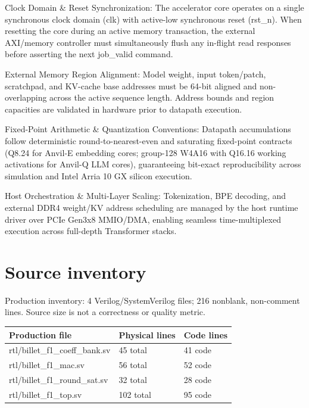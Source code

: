 \documentclass[11pt,a4paper]{article}
\begin{document}
Clock Domain \& Reset Synchronization: The accelerator core operates on a single synchronous clock domain (\allowbreak{}clk)\allowbreak{} with active-low synchronous reset (\allowbreak{}rst\_\allowbreak{}n)\allowbreak{}. When resetting the core during an active memory transaction,\allowbreak{} the external AXI/\allowbreak{}memory controller must simultaneously flush any in-flight read responses before asserting the next job\_\allowbreak{}valid command.


External Memory Region Alignment: Model weight,\allowbreak{} input token/\allowbreak{}patch,\allowbreak{} scratchpad,\allowbreak{} and KV-cache base addresses must be 64-bit aligned and non-overlapping across the active sequence length. Address bounds and region capacities are validated in hardware prior to datapath execution.


Fixed-Point Arithmetic \& Quantization Conventions: Datapath accumulations follow deterministic round-to-nearest-even and saturating fixed-point contracts (\allowbreak{}Q8.24 for Anvil-E embedding cores; group-128 W4A16 with Q16.16 working activations for Anvil-Q LLM cores)\allowbreak{},\allowbreak{} guaranteeing bit-exact reproducibility across simulation and Intel Arria 10 GX silicon execution.


Host Orchestration \& Multi-Layer Scaling: Tokenization,\allowbreak{} BPE decoding,\allowbreak{} and external DDR4 weight/\allowbreak{}KV address scheduling are managed by the host runtime driver over PCIe Gen3x8 MMIO/\allowbreak{}DMA,\allowbreak{} enabling seamless time-multiplexed execution across full-depth Transformer stacks.


\appendix{}\section{Source inventory}

Production inventory: 4 Verilog/\allowbreak{}SystemVerilog files; 216 nonblank,\allowbreak{} non-comment lines. Source size is not a correctness or quality metric.

{\small\renewcommand{\arraystretch}{1.18}\begin{longtable}{@{}L{0.55\textwidth}|L{0.18\textwidth}|L{0.18\textwidth}@{}}\toprule

\textbf{Production file} & \textbf{Physical lines} & \textbf{Code lines}\\\midrule\endhead

rtl/\allowbreak{}billet\_\allowbreak{}f1\_\allowbreak{}coeff\_\allowbreak{}bank.sv & 45 total & 41 code\\[2pt]\hline

rtl/\allowbreak{}billet\_\allowbreak{}f1\_\allowbreak{}mac.sv & 56 total & 52 code\\[2pt]\hline

rtl/\allowbreak{}billet\_\allowbreak{}f1\_\allowbreak{}round\_\allowbreak{}sat.sv & 32 total & 28 code\\[2pt]\hline

rtl/\allowbreak{}billet\_\allowbreak{}f1\_\allowbreak{}top.sv & 102 total & 95 code\\[2pt]\hline

\bottomrule\end{longtable}}
\end{document}
